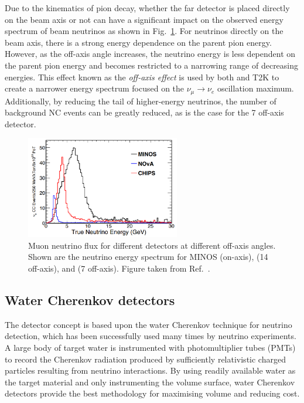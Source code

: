 Due to the kinematics of pion decay, whether the far detector is placed directly on the beam axis
or not can have a significant impact on the observed energy spectrum of beam neutrinos as shown in
Fig.~\ref{fig:numi_axis}. For neutrinos directly on the beam axis, there is a strong energy
dependence on the parent pion energy. However, as the off-axis angle increases, the neutrino
energy is less dependent on the parent pion energy and becomes restricted to a narrowing range of
decreasing energies. This effect known as the \emph{off-axis effect} is used by both \nova and T2K
to create a narrower energy spectrum focused on the $\nu_{\mu}\rightarrow\nu_{e}$ oscillation
maximum. Additionally, by reducing the tail of higher-energy neutrinos, the number of background
NC events can be greatly reduced, as is the case for the \unit{7}{} off-axis
\chipsfive detector.

\begin{figure} %
    \includegraphics[width=0.6\textwidth]{diagrams/4-chips/numi_axis.png}
    \caption[Muon neutrino flux for different \numi detectors at different off-axis angles.]
    {Muon neutrino flux for different \numi detectors at different off-axis angles. Shown are the
        neutrino energy spectrum for MINOS (on-axis), \nova (\unit{14}{} off-axis),
        and \chipsfive (\unit{7}{} off-axis). Figure taken from
        Ref.~\cite{adamson2013}.}
    \label{fig:numi_axis}
\end{figure}

\subsection{Water Cherenkov detectors} %
\label{sec:chips_concept_cherenkov} %

The \chips detector concept is based upon the water Cherenkov technique for neutrino detection,
which has been successfully used many times by neutrino experiments. A large body of target water
is instrumented with photomultiplier tubes (PMTs) to record the Cherenkov radiation produced by
sufficiently relativistic charged particles resulting from neutrino interactions. By using readily
available water as the target material and only instrumenting the volume surface, water Cherenkov
detectors provide the best methodology for maximising volume and reducing cost.

